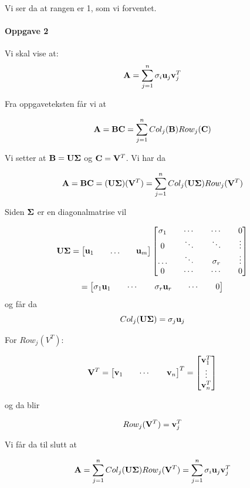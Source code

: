 \documentclass[a4paper,norsk, 10pt]{article}
\begin{document}
Vi ser da at rangen er 1, som vi forventet.

\newpage


\paragraph*{Oppgave 2}

Vi skal vise at:
$$
\bold{A} = \sum_{j=1}^n \sigma_i \bold{u}_j \bold{v}_j^T
$$

Fra oppgaveteksten får vi at

$$
\bold{A} = \bold{BC} = \sum_{j=1}^n Col_j(\bold{B}) Row_j(\bold{C})
$$

Vi setter at $\bold{B} = \bold{U}\bold{\Sigma}$ og $\bold{C} = \bold{V}^T$. Vi har da

$$
\bold{A} = \bold{BC} = (\bold{U\Sigma})(\bold{V}^T) = \sum_{j=1}^n Col_j(\bold{U\Sigma}) Row_j(\bold{V}^T)
$$

Siden $\bold{\Sigma}$ er en diagonalmatrise vil 

$$
\bold{U\Sigma} =
\begin{bmatrix}
\bold{u}_1 && \ldots && \bold{u}_m
\end{bmatrix}
\begin{bmatrix}
\sigma_1 && \cdots && \cdots && 0 \\
0 && \ddots && \ddots && \vdots \\
\ldots && \ddots && \sigma_r && \vdots \\
0 && \cdots && \cdots && 0
\end{bmatrix}
$$
$$
=
\begin{bmatrix}
\sigma_1 \bold{u}_1 && \cdots && \sigma_r \bold{u}_r && \cdots && 0
\end{bmatrix}
$$
og får da
$$
Col_j(\bold{U\Sigma}) = \sigma_j \bold{u}_j 
$$

For $Row_j(V^T)$:

$$
\bold{V}^T = 
\begin{bmatrix}
\bold{v}_1 && \cdots && \bold{v}_n
\end{bmatrix}^T
=
\begin{bmatrix}
\bold{v}_1^T \\
\vdots \\
\bold{v}_n^T
\end{bmatrix}
$$

og da blir 

$$
Row_j(\bold{V}^T) = \bold{v}_j^T
$$

Vi får da til slutt at 

\begin{equation}
\bold{A} = \sum_{j=1}^n Col_j(\bold{U\Sigma}) Row_j(\bold{V}^T) = \sum_{j=1}^n \sigma_i \bold{u}_j \bold{v}_j^T
\end{equation}
\end{document}

